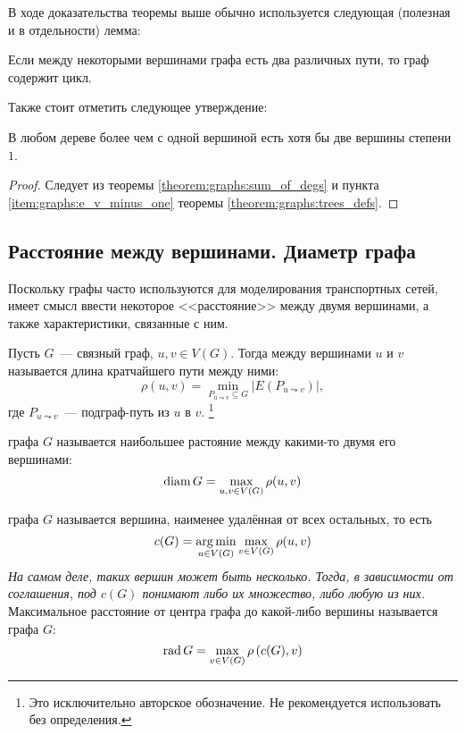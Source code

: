 В ходе доказательства теоремы выше обычно используется следующая (полезная и в отдельности) лемма:
\begin{lemma}
    Если между некоторыми вершинами графа есть два различных пути, то граф содержит цикл.
\end{lemma}

Также стоит отметить следующее утверждение:
\begin{corollary}
    В любом дереве более чем с одной вершиной есть хотя бы две вершины степени $ 1 $.
\end{corollary}

\begin{proof}
    Следует из теоремы \ref{theorem:graphs:sum_of_degs} и пункта \ref{item:graphs:e_v_minus_one} теоремы \ref{theorem:graphs:trees_defs}.
\end{proof}



\subsection{Расстояние между вершинами. Диаметр графа}
\label{subsec:graphs:dist_and_diam}

Поскольку графы часто используются для моделирования транспортных сетей, имеет смысл ввести некоторое <<расстояние>> между двумя вершинами, а также характеристики, связанные с ним.

\begin{definition}
    Пусть $ G $~--- связный граф, $ u, v \in V(G) $.
    Тогда  между вершинами $ u $ и $ v $ называется длина кратчайшего пути между ними:
    \[
        \rho(u, v) = \min_{P_{u \leadsto v} \subseteq G} |E(P_{u \leadsto v})|,
    \]
    где $ P_{u \leadsto v} $~--- подграф-путь из $ u $ в $ v $.%
    \footnote{Это исключительно авторское обозначение. Не рекомендуется использовать без определения.}
\end{definition}

\begin{definition}
     графа $ G $ называется наибольшее растояние между какими-то двумя его вершинами:
    \[
        \operatorname{\textnormal{diam}} G = \max_{u, v \in V(G)} \rho(u, v)
    \]
\end{definition}

\begin{definition}
     графа $ G $ называется вершина, наименее удалённая от всех остальных, то есть
    \[
        c(G) = \operatorname*{\arg\min}_{u \in V(G)} \max_{v \in V(G)} \rho(u, v)
    \]
    \textit{На самом деле, таких вершин может быть несколько. Тогда, в зависимости от соглашения, под $ c(G) $ понимают либо их множество, либо любую из них.}
    \newline
    Максимальное расстояние от центра графа до какой-либо вершины называется  графа $ G $:
    \[
        \operatorname{\textnormal{rad}} G = \max_{v \in V(G)} \rho\left( c(G), v \right)
    \]
\end{definition}



